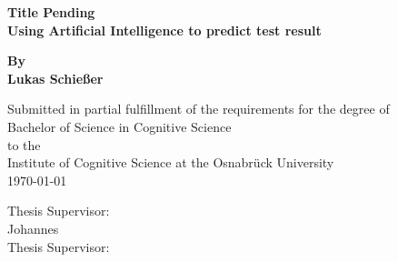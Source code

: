\begin{titlepage}
	\begin{center}
		\vspace*{1cm}
		\Huge
		\textbf{Title Pending \\} 
		\vspace{0.5cm}
		\Large
		\textbf{Using Artificial Intelligence to predict test result}
		
		\vspace{1cm}
		
		\textbf{By \\ Lukas Schießer}
		
		\vspace{1cm}
		\small
		Submitted in partial fulfillment of the requirements for the degree of \\
		Bachelor of Science in Cognitive Science \\ to the \\
		Institute of Cognitive Science at the Osnabrück University\\
		\today
		
		\vfill
		\vspace{1cm}
		Thesis Supervisor:\\ Johannes  \\
		Thesis Supervisor:\\   
		
		
		
	\end{center}
\end{titlepage}